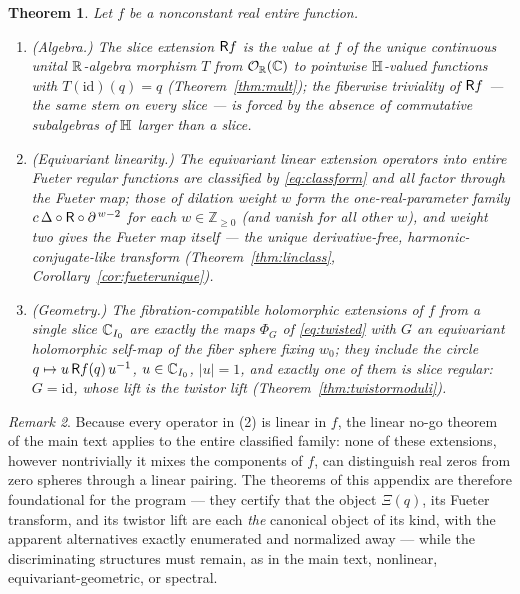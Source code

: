 \documentclass[11pt]{amsart}
\newtheorem{theorem}{Theorem}[section]
\theoremstyle{definition}
\theoremstyle{remark}
\newtheorem{remark}[theorem]{Remark}
\begin{document}
\begin{theorem}\label{thm:summary}
Let $f$ be a nonconstant real entire function.
\begin{enumerate}
\item \textup{(Algebra.)}  The slice extension $\mathsf{R} f$ is the value at
$f$ of the unique continuous unital $\mathbb{R}$-algebra morphism $T$ from
$\mathcal{O}_{\mathbb{R}}(\mathbb{C})$ to pointwise $\mathbb{H}$-valued functions with $T(\mathrm{id})(q)=q$
\textup{(Theorem~\ref{thm:mult})}; the fiberwise triviality of $\mathsf{R} f$
--- the same stem on every slice --- is forced by the absence of
commutative subalgebras of $\mathbb{H}$ larger than a slice.
\item \textup{(Equivariant linearity.)}  The equivariant linear extension
operators into entire Fueter regular functions are classified by
\eqref{eq:classform} and all factor through the Fueter map; those of
dilation weight $w$ form the one-real-parameter family
$c\,\Delta\circ\mathsf{R}\circ\partial^{\,w-2}$ for each $w\in\mathbb{Z}_{\ge0}$
\textup{(}and vanish for all other $w$\textup{)}, and weight two gives
the Fueter map itself --- the unique derivative-free,
harmonic-conjugate-like transform
\textup{(Theorem~\ref{thm:linclass},
Corollary~\ref{cor:fueterunique})}.
\item \textup{(Geometry.)}  The fibration-compatible holomorphic
extensions of $f$ from a single slice $\mathbb{C}_{I_0}$ are exactly the maps
$\Phi_G$ of \eqref{eq:twisted} with $G$ an equivariant holomorphic
self-map of the fiber sphere fixing $w_0$; they include the circle
$q\mapsto u\,\mathsf{R} f(q)\,u^{-1}$, $u\in\mathbb{C}_{I_0}$, $|u|=1$, and exactly
one of them is slice regular: $G=\mathrm{id}$, whose lift is the twistor
lift \textup{(Theorem~\ref{thm:twistormoduli})}.
\end{enumerate}
\end{theorem}

\begin{remark}
Because every operator in (2) is linear in $f$, the linear no-go theorem
of the main text applies to the entire classified family: none of these
extensions, however nontrivially it mixes the components of $f$, can
distinguish real zeros from zero spheres through a linear pairing.  The
theorems of this appendix are therefore foundational for the program ---
they certify that the object $\Xi(q)$, its Fueter transform, and its
twistor lift are each \emph{the} canonical object of its kind, with the
apparent alternatives exactly enumerated and normalized away --- while
the discriminating structures must remain, as in the main text,
nonlinear, equivariant-geometric, or spectral.
\end{remark}
\end{document}
